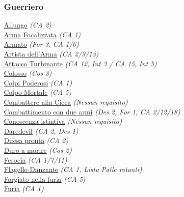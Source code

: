 \begin{multicols}{3}

{\small

\begin{flushleft}

\titlespacing*{\subsubsection}{0pt}{0.5em}{0.5em}\subsubsection*{Guerriero}


\hyperlink{Allungo}{Allungo} \textit{(CA 2)}\\
\hyperlink{Arma Focalizzata}{Arma Focalizzata} \textit{(CA 1)}\\
\hyperlink{Armato}{Armato} \textit{(For 3, CA 1/6)}\\
\hyperlink{Artista dell'Arma}{Artista dell'Arma} \textit{(CA 2/9/13)}\\
\hyperlink{Attacco Turbinante}{Attacco Turbinante} \textit{(CA 12, Int 3 / CA 15, Int 5)}\\
\hyperlink{Colosso}{Colosso} \textit{(Cos 3)}\\
\hyperlink{Colpi Poderosi}{Colpi Poderosi} \textit{(CA 1)}\\
\hyperlink{Colpo Mortale}{Colpo Mortale} \textit{(CA 5)}\\
\hyperlink{Combattere alla Cieca}{Combattere alla Cieca} \textit{(Nessun requisito)}\\
\hyperlink{Combattimento con due armi}{Combattimento con due armi} \textit{(Des 2, For 1, CA 2/12/18)}\\
\hyperlink{Conoscenza istintiva}{Conoscenza istintiva} \textit{(Nessun requisito)}\\
\hyperlink{Daredevil}{Daredevil} \textit{(CA 2, Des 1)}\\
\hyperlink{Difesa pronta}{Difesa pronta} \textit{(CA 2)}\\
\hyperlink{Duro a morire}{Duro a morire} \textit{(Cos 2)}\\
\hyperlink{Ferocia}{Ferocia} \textit{(CA 1/7/11)}\\
\hyperlink{Flagello Danzante}{Flagello Danzante} \textit{(CA 1, Lista Palle rotanti)}\\
\hyperlink{Forgiato nella furia}{Forgiato nella furia} \textit{(CA 5)}\\
\hyperlink{Furia}{Furia} \textit{(CA 1)}\\

\end{flushleft}}
\end{multicols}
